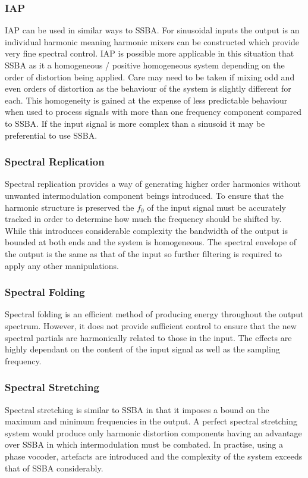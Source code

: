 		\subsubsection*{IAP}
			IAP can be used in similar ways to SSBA. For sinusoidal inputs the output is an individual harmonic
			meaning harmonic mixers can be constructed which provide very fine spectral control. IAP is
			possible more applicable in this situation that SSBA as it a homogeneous / positive homogeneous
			system depending on the order of distortion being applied. Care may need to be taken if mixing odd
			and even orders of distortion as the behaviour of the system is slightly different for each. This
			homogeneity is gained at the expense of less predictable behaviour when used to process signals
			with more than one frequency component compared to SSBA. If the input signal is more complex than a
			sinusoid it may be preferential to use SSBA.

		\subsubsection*{Spectral Replication}
			Spectral replication provides a way of generating higher order harmonics without unwanted
			intermodulation component beings introduced. To ensure that the harmonic structure is preserved the
			$f_{0}$ of the input signal must be accurately tracked in order to determine how much the frequency
			should be shifted by. While this introduces considerable complexity the bandwidth of the output is
			bounded at both ends and the system is homogeneous. The spectral envelope of the output is the same
			as that of the input so further filtering is required to apply any other manipulations.

		\subsubsection*{Spectral Folding}
			Spectral folding is an efficient method of producing energy throughout the output spectrum.
			However, it does not provide sufficient control to ensure that the new spectral partials are
			harmonically related to those in the input. The effects are highly dependant on the content of the
			input signal as well as the sampling frequency.

		\subsubsection*{Spectral Stretching}
			Spectral stretching is similar to SSBA in that it imposes a bound on the maximum and minimum
			frequencies in the output. A perfect spectral stretching system would produce only harmonic
			distortion components having an advantage over SSBA in which intermodulation must be combated. In
			practise, using a phase vocoder, artefacts are introduced and the complexity of the system exceeds
			that of SSBA considerably.

